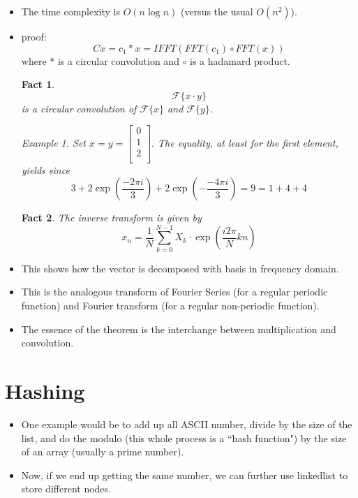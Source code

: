 \documentclass{article}
\newtheorem{fact}{Fact}
\theoremstyle{remark}
\newtheorem{example}{Example}
\begin{document}
\begin{itemize}
\item The time complexity is $O(n\log n)$ (versus the usual $O(n^2)$).
\item proof: 
\[
Cx=c_1 * x=IFFT(FFT(c_1)\circ FFT(x))
\]
where * is a circular convolution and $\circ$ is a hadamard product.
\begin{fact}
\[
\mathcal{F}\{x\cdot y\}
\]
is a circular convolution of $\mathcal{F}\{x\}$ and $\mathcal{F}\{y\}$.
\begin{example}
Set \( x = y = \begin{bmatrix}
    0 \\
    1 \\
    2 \\
    \end{bmatrix}.
     \)
The equality, at least for the first element, yields since
\[
3 + 2\exp\left(\frac{-2\pi i}{3}\right) + 2\exp\left(-\frac{-4\pi i}{3}\right) = 9 = 1 + 4 + 4
\]
\end{example}
\end{fact}
\begin{fact}
The inverse transform is given by
\[
x_n=\frac 1N \sum\limits^{N-1}_{k=0}X_k\cdot \exp(\frac{i2\pi}N kn)
\]
\end{fact}
\item This shows how the vector is decomposed with basis in frequency domain.
\item This is the analogous transform of Fourier 
Series (for a regular periodic function) and Fourier transform 
(for a regular non-periodic function).
\item The essence of the theorem is the interchange between multiplication and convolution.
\end{itemize}

\section*{Hashing}
\begin{itemize}
\item One example would be to add up all ASCII number,
 divide by the size of the list, and do the modulo (this whole process is a ``hash function") by the
  size of an array (usually a prime number).
\item Now, if we end up getting the same number, we can further use linkedlist to store different nodes.
\end{itemize}
\end{document}
